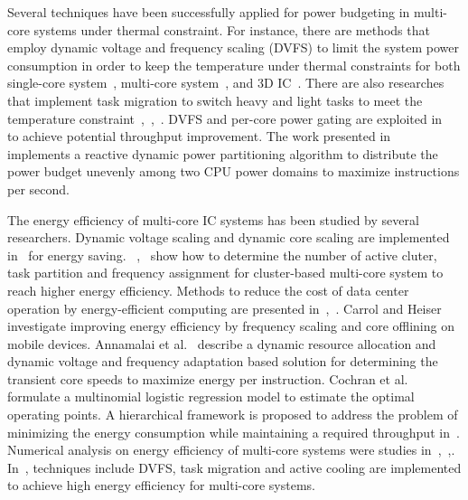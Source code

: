 Several techniques have been successfully applied for power budgeting in multi-core systems under thermal constraint. For instance, there are methods that employ dynamic voltage and frequency scaling (DVFS) to limit the system power consumption in order to keep the temperature under thermal constraints for both single-core system~\cite{Skadron:MICRO'03}, multi-core system~\cite{Jayaseelan:ICCAD'09}, and 3D IC~\cite{Coskun:DATE'09}. There are also researches that implement task migration to switch heavy and light tasks to meet the temperature constraint~\cite{Ge:DAC'10},~\cite{Chantem:TVLSI'11},~\cite{Liu:DATE'12}. DVFS and per-core power gating are exploited in~\cite{Lee:TVLSI'12} to achieve potential throughput improvement. The work presented in~\cite{Kultursay:CHSCSS'12} implements a reactive dynamic power partitioning 
algorithm to distribute the power budget unevenly among two CPU power domains to maximize instructions per second. %

The energy efficiency of multi-core IC systems has been studied by several researchers. Dynamic voltage scaling and dynamic core scaling are implemented in~\cite{Seo:TPDS'08} for energy saving. ~\cite{Majzoub:TCAD'10},~\cite{Kong:DATE'11} show how to determine the number of active cluter, task partition and frequency assignment for cluster-based multi-core system to reach higher energy efficiency. Methods to reduce the cost of data center operation by energy-efficient computing are presented in~\cite{Pedram:TCAD'12},~\cite{Wang:access'17}. Carrol and Heiser~\cite{Carroll:RTAS'14} investigate improving energy efficiency by frequency scaling and core offlining on mobile devices. Annamalai et al.~\cite{Annamalai:ISVLSI'14} describe a dynamic resource allocation and dynamic voltage and frequency adaptation based solution for determining the transient core speeds to maximize energy per instruction. Cochran et al.~\cite{Cochran:ICCAD'11} formulate a multinomial logistic regression model to estimate the optimal operating points. A hierarchical framework is proposed to address the problem of minimizing the energy consumption while maintaining a required throughput in~\cite{Ghasemazar:ISCAS'10}. Numerical analysis on energy efficiency of multi-core systems were studies in~\cite{Woo:Computer'08},~\cite{Hill:Computer'08},\cite{Sun:JPDC'10}. In~\cite{Hanumaiah:TCOMP'14}, techniques include DVFS, task migration and active cooling are implemented to achieve high energy efficiency for multi-core systems.

